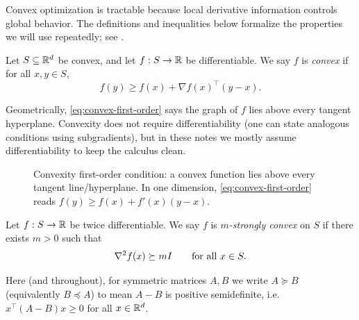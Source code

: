 Convex optimization is tractable because local derivative information controls global behavior.
The definitions and inequalities below formalize the properties we will use repeatedly; see \citet[Ch.~9]{boyd_vandenberghe_2004_convex}.

\begin{definition}
Let $S \subseteq \mathbb{R}^d$ be convex, and let $f:S\to\mathbb{R}$ be differentiable.
We say $f$ is \emph{convex} if for all $x,y \in S$,
\begin{equation}
  f(y) \ge f(x) + \nabla f(x)^\top (y-x).
  \label{eq:convex-first-order}
\end{equation}
\end{definition}

Geometrically, \eqref{eq:convex-first-order} says the graph of $f$ lies above every tangent hyperplane.
Convexity does not require differentiability (one can state analogous conditions using subgradients), but in these notes we mostly assume differentiability to keep the calculus clean.

\begin{figure}[t]
  \centering
  
  \caption{Convexity first-order condition: a convex function lies above every tangent line/hyperplane.
  In one dimension, \eqref{eq:convex-first-order} reads $f(y)\ge f(x) + f'(x)(y-x)$.}
  \label{fig:convexity-tangent}
\end{figure}

\begin{definition}
Let $f:S\to\mathbb{R}$ be twice differentiable.
We say $f$ is \emph{$m$-strongly convex} on $S$ if there exists $m>0$ such that
\begin{equation}
  \nabla^2 f(x) \succeq m I
  \qquad \text{for all } x \in S.
  \label{eq:strong-convex-hess}
\end{equation}
\end{definition}

Here (and throughout), for symmetric matrices $A,B$ we write $A \succeq B$ (equivalently $B \preceq A$) to mean $A-B$ is positive semidefinite, i.e.\ $x^\top(A-B)x\ge 0$ for all $x\in\mathbb{R}^d$.

